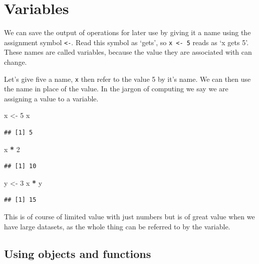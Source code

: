 \documentclass[
]{book}
\newenvironment{Shaded}{\begin{snugshade}}{\end{snugshade}}
\newcommand{\DecValTok}[1]{\textcolor[rgb]{0.00,0.00,0.81}{#1}}
\newcommand{\NormalTok}[1]{#1}
\newcommand{\OperatorTok}[1]{\textcolor[rgb]{0.81,0.36,0.00}{\textbf{#1}}}
\newcommand{\StringTok}[1]{\textcolor[rgb]{0.31,0.60,0.02}{#1}}
\begin{document}
\hypertarget{variables}{%
\section{Variables}\label{variables}}

We can save the output of operations for later use by giving it a name using the assignment symbol \texttt{\textless{}-}. Read this symbol as `gets', so \texttt{x\ \textless{}-\ 5} reads as `x gets 5'. These names are called variables, because the value they are associated with can change.

Let's give five a name, \texttt{x} then refer to the value 5 by it's name. We can then use the name in place of the value. In the jargon of computing we say we are assigning a value to a variable.

\begin{Shaded}
\begin{Highlighting}[]
\NormalTok{ x <-}\StringTok{ }\DecValTok{5}
\NormalTok{ x}
\end{Highlighting}
\end{Shaded}

\begin{verbatim}
## [1] 5
\end{verbatim}

\begin{Shaded}
\begin{Highlighting}[]
\NormalTok{ x }\OperatorTok{*}\StringTok{ }\DecValTok{2}
\end{Highlighting}
\end{Shaded}

\begin{verbatim}
## [1] 10
\end{verbatim}

\begin{Shaded}
\begin{Highlighting}[]
\NormalTok{y <-}\StringTok{ }\DecValTok{3}
\NormalTok{x }\OperatorTok{*}\StringTok{ }\NormalTok{y}
\end{Highlighting}
\end{Shaded}

\begin{verbatim}
## [1] 15
\end{verbatim}

This is of course of limited value with just numbers but is of great value when we have large datasets, as the whole thing can be referred to by the variable.

\hypertarget{using-objects-and-functions}{%
\subsection{Using objects and functions}\label{using-objects-and-functions}}
\end{document}
